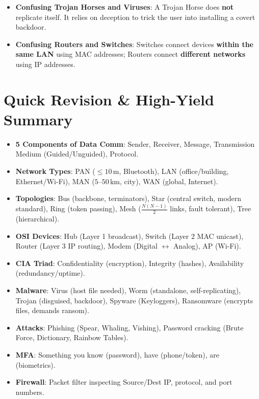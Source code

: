 \begin{commonmistake}
\begin{itemize}
    \item \textbf{Confusing Trojan Horses and Viruses}: A Trojan Horse does \textbf{not} replicate itself. It relies on deception to trick the user into installing a covert backdoor.
    \item \textbf{Confusing Routers and Switches}: Switches connect devices \textbf{within the same LAN} using MAC addresses; Routers connect \textbf{different networks} using IP addresses.
\end{itemize}
\end{commonmistake}

\section{Quick Revision \& High-Yield Summary}

\begin{quickrevision}
\begin{itemize}
    \item \textbf{5 Components of Data Comm}: Sender, Receiver, Message, Transmission Medium (Guided/Unguided), Protocol.
    \item \textbf{Network Types}: PAN ($\le 10\,\text{m}$, Bluetooth), LAN (office/building, Ethernet/Wi-Fi), MAN ($5\text{--}50\,\text{km}$, city), WAN (global, Internet).
    \item \textbf{Topologies}: Bus (backbone, terminators), Star (central switch, modern standard), Ring (token passing), Mesh ($\frac{N(N-1)}{2}$ links, fault tolerant), Tree (hierarchical).
    \item \textbf{OSI Devices}: Hub (Layer 1 broadcast), Switch (Layer 2 MAC unicast), Router (Layer 3 IP routing), Modem (Digital $\leftrightarrow$ Analog), AP (Wi-Fi).
    \item \textbf{CIA Triad}: Confidentiality (encryption), Integrity (hashes), Availability (redundancy/uptime).
    \item \textbf{Malware}: Virus (host file needed), Worm (standalone, self-replicating), Trojan (disguised, backdoor), Spyware (Keyloggers), Ransomware (encrypts files, demands ransom).
    \item \textbf{Attacks}: Phishing (Spear, Whaling, Vishing), Password cracking (Brute Force, Dictionary, Rainbow Tables).
    \item \textbf{MFA}: Something you know (password), have (phone/token), are (biometrics).
    \item \textbf{Firewall}: Packet filter inspecting Source/Dest IP, protocol, and port numbers.
\end{itemize}
\end{quickrevision}

